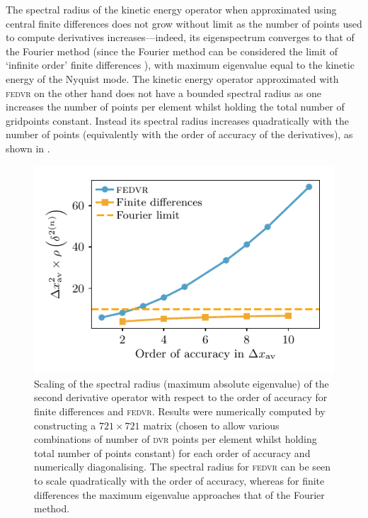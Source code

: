 The spectral radius of the kinetic energy operator when approximated using central finite differences does not grow without limit as the number of points used to compute derivatives increases---indeed, its eigenspectrum converges to that of the Fourier method (since the Fourier method can be considered the limit of `infinite order' finite differences \cite{fornberg_pseudospectral_1987}), with maximum eigenvalue equal to the kinetic energy of the Nyquist mode. The kinetic energy operator approximated with \textsc{fedvr} on the other hand does not have a bounded spectral radius as one increases the number of points per element whilst holding the total number of gridpoints constant. Instead its spectral radius increases quadratically with the number of points (equivalently with the order of accuracy of the derivatives), as shown in .

\begin{figure}[t]
    \centerfloat
    \includegraphics{figures/numerics/fedvr_eigenvalue_scaling.pdf}
    \caption{Scaling of the spectral radius (maximum absolute eigenvalue) of the second derivative operator with respect to the order of accuracy for finite differences and \textsc{fedvr}. Results were numerically computed by constructing a $721\times721$ matrix (chosen to allow various combinations of number of \textsc{dvr} points per element whilst holding total number of points constant) for each order of accuracy and numerically diagonalising. The spectral radius for \textsc{fedvr} can be seen to scale quadratically with the order of accuracy, whereas for finite differences the maximum eigenvalue approaches that of the Fourier method.}
    \label{fig:fedvr_eigenvalue_scaling}
\end{figure}

